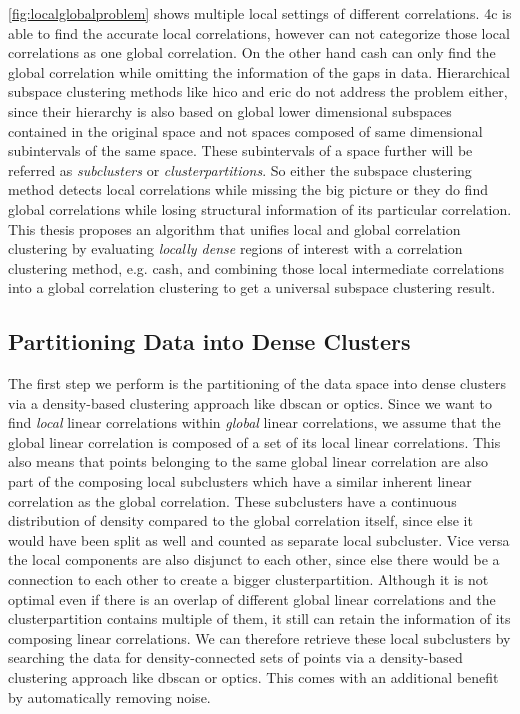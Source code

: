 \autoref{fig:localglobalproblem}  shows multiple local settings of different correlations. \gls{4c} is able to find the accurate local correlations, however can not categorize those local correlations as one global correlation. 
On the other hand \gls{cash} can only find the global correlation while omitting the information of the gaps in data. Hierarchical subspace clustering methods like \gls{hico} and \gls{eric} do not address the problem either, since their hierarchy is also based on global lower dimensional subspaces contained in the original space and not spaces composed of same dimensional subintervals of the same space. These subintervals of a space further will be referred as \textit{subclusters} or \textit{clusterpartitions}.
So either the subspace clustering method detects local correlations while missing the big picture or they do find global correlations while losing structural information of its particular correlation. This thesis proposes an algorithm that unifies local and global correlation clustering by evaluating \textit{locally dense} regions of interest with a correlation clustering method, e.g. \gls{cash}, and combining those local intermediate correlations into a global correlation clustering to get a universal subspace clustering result. 


\subsection{Partitioning Data into Dense Clusters}
The first step we perform is the partitioning of the data space into dense clusters via a density-based clustering approach like \gls{dbscan} or \gls{optics}. 
Since we want to find \textit{local} linear correlations within \textit{global} linear correlations, we assume that the global linear correlation is composed of a set of its local linear correlations. This also means that points belonging to the same global linear correlation are also part of the composing local subclusters which have a similar inherent linear correlation as the global correlation. These subclusters have a continuous distribution of density compared to the global correlation itself, since else it would have been split as well and counted as separate local subcluster. Vice versa the local components are also disjunct to each other, since else there would be a connection to each other to create a bigger clusterpartition. Although it is not optimal even if there is an overlap of different global linear correlations and the clusterpartition contains multiple of them, it still can retain the information of its composing linear correlations.
We can therefore retrieve these local subclusters by searching the data for density-connected sets of points via a density-based clustering approach like \gls{dbscan} or \gls{optics}. This comes with an additional benefit by automatically removing noise. 

